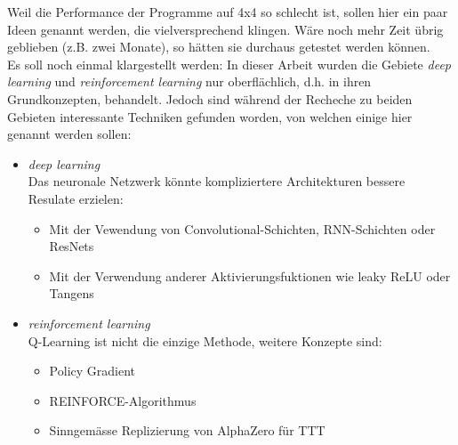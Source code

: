 \documentclass[12pt,a4paper]{article}
\begin{document}
Weil die Performance der Programme auf 4x4 so schlecht ist, sollen hier ein paar Ideen genannt werden, die  vielversprechend klingen. Wäre noch mehr Zeit übrig geblieben (z.B. zwei Monate), so hätten sie durchaus getestet
werden können.\\
Es soll noch einmal klargestellt werden: In dieser Arbeit wurden die Gebiete \textit{deep learning} und \textit{reinforcement learning} nur oberflächlich, d.h. in ihren Grundkonzepten, behandelt. Jedoch sind während der Recheche zu beiden Gebieten interessante Techniken gefunden worden, von welchen einige hier genannt werden sollen:
\begin{itemize}
\item{\textit{deep learning}\\
	Das neuronale Netzwerk könnte kompliziertere Architekturen bessere Resulate erzielen:
	\begin{itemize}
	\item{Mit der Vewendung von Convolutional-Schichten\cite{video5}, RNN-Schichten\cite{video10} oder ResNets\cite{video9}}
	\item{Mit der Verwendung anderer Aktivierungsfuktionen wie leaky ReLU oder Tangens\cite{video6}}
	\end{itemize}
}
\item{\textit{reinforcement learning}\\
	Q-Learning ist nicht die einzige Methode, weitere Konzepte sind:
	\begin{itemize}
	\item{Policy Gradient\cite{lilblog}}
	\item{REINFORCE-Algorithmus\cite{lilblog}}
	\item{Sinngemässe Replizierung von AlphaZero\cite{alphapaper} für TTT}
	\end{itemize}
}
\end{itemize}
\end{document}
